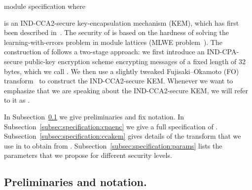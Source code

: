 


\begin{code}
  module specification where
\end{code}


\Kyber is an IND-CCA2-secure key-encapsulation mechanism (KEM),
which has first been described in~\cite{BDK+18}.
The security of \Kyber is based on the hardness of solving the learning-with-errors
problem in module lattices (MLWE problem~\cite{DCC:LS15}). 
The construction of \Kyber follows a two-stage approach: we first introduce
an IND-CPA-secure public-key encryption scheme encrypting messages of a fixed length of 32 bytes, 
which we call \KyberCPAPKE. We then use a slightly tweaked Fujisaki--Okamoto (FO) 
transform~\cite{C:FujOka99} to construct the IND-CCA2-secure KEM. 
Whenever we want to emphasize that we are speaking about the IND-CCA2-secure KEM, 
we will refer to it as \KyberCCAKEM. 

In Subsection~\ref{subsec:specification:prelim} we give preliminaries and fix notation.
In Subsection~\ref{subsec:specification:cpaenc} we give a full specification of \KyberCPAPKE.
Subsection~\ref{subsec:specification:ccakem} gives details of the transform that we use in \Kyber
to obtain \KyberCCAKEM from \KyberCPAPKE.
Subsection~\ref{subsec:specification:params} lists the parameters that we propose for different security levels.


\subsection{Preliminaries and notation.}
\label{subsec:specification:prelim}


